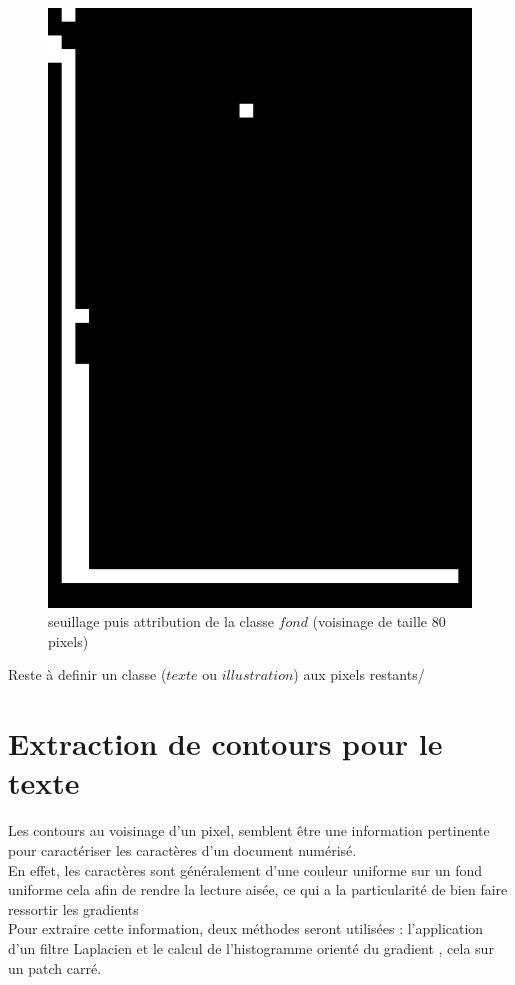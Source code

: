 \documentclass{book}
\begin{document}
\begin{figure}[H]
\begin{center}
\includegraphics[scale=0.2]{images/1g_seuil.jpg}
\end{center}
\caption{seuillage puis attribution de la classe $fond$ (voisinage de taille 80 pixels)}
\label{seuillage}
\end{figure}

Reste à definir un classe ($texte$ ou $illustration$) aux pixels restants/ 

\section{Extraction de contours pour le texte}

Les contours au voisinage d'un pixel, semblent être une information pertinente pour caractériser les caractères d'un document numérisé.\\
En effet, les caractères sont généralement d'une couleur uniforme sur un fond uniforme cela afin de rendre la lecture aisée, ce qui a la 
particularité de bien faire ressortir les gradients\\
Pour extraire cette information, deux méthodes seront utilisées : l'application d'un filtre Laplacien et le calcul de l'histogramme orienté du gradient 
\cite{Dala05histogramsof}, cela sur un patch carré. 
\end{document}
